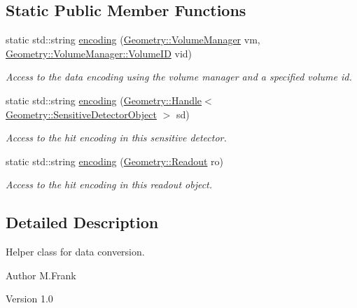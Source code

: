 \subsection*{Static Public Member Functions}
\begin{DoxyCompactItemize}
\item 
static std::string \hyperlink{class_d_d4hep_1_1_simulation_1_1_geant4_conversion_helper_a0a26b1a641a6b57ba1d5f92d941e9809}{encoding} (\hyperlink{class_d_d4hep_1_1_geometry_1_1_volume_manager}{Geometry::VolumeManager} vm, \hyperlink{class_d_d4hep_1_1_geometry_1_1_volume_manager_ab1f746b561c93be38bc7c6e66fc8ca8a}{Geometry::VolumeManager::VolumeID} vid)
\begin{DoxyCompactList}\small\item\em Access to the data encoding using the volume manager and a specified volume id. \item\end{DoxyCompactList}\item 
static std::string \hyperlink{class_d_d4hep_1_1_simulation_1_1_geant4_conversion_helper_a90f912fdcfa4e17d2179e714318b53e4}{encoding} (\hyperlink{class_d_d4hep_1_1_handle}{Geometry::Handle}$<$ \hyperlink{class_d_d4hep_1_1_geometry_1_1_sensitive_detector_object}{Geometry::SensitiveDetectorObject} $>$ sd)
\begin{DoxyCompactList}\small\item\em Access to the hit encoding in this sensitive detector. \item\end{DoxyCompactList}\item 
static std::string \hyperlink{class_d_d4hep_1_1_simulation_1_1_geant4_conversion_helper_aba7692df239d8234dbab1ad724b149a3}{encoding} (\hyperlink{class_d_d4hep_1_1_geometry_1_1_readout}{Geometry::Readout} ro)
\begin{DoxyCompactList}\small\item\em Access to the hit encoding in this readout object. \item\end{DoxyCompactList}\end{DoxyCompactItemize}


\subsection{Detailed Description}
Helper class for data conversion. \begin{DoxyAuthor}{Author}
M.Frank 
\end{DoxyAuthor}
\begin{DoxyVersion}{Version}
1.0 
\end{DoxyVersion}


